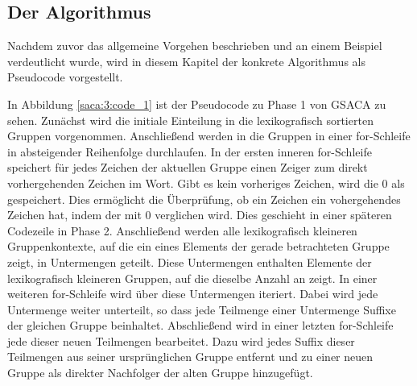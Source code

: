 \newpage
\subsection{Der Algorithmus}
\label{gsaca:chapter4}
%
Nachdem zuvor das allgemeine Vorgehen beschrieben und an einem Beispiel verdeutlicht wurde, wird in diesem Kapitel der konkrete Algorithmus als Pseudocode vorgestellt. 

In Abbildung \ref{saca:3:code_1} ist der Pseudocode zu Phase 1 von GSACA zu sehen.
Zunächst wird die initiale Einteilung in die lexikografisch sortierten Gruppen vorgenommen. 
Anschließend werden in die Gruppen in einer for-Schleife in absteigender Reihenfolge durchlaufen.
In der ersten inneren for-Schleife speichert für jedes Zeichen der aktuellen Gruppe einen Zeiger zum direkt vorhergehenden Zeichen im Wort.
Gibt es kein vorheriges Zeichen, wird die 0 als \prevpointer gespeichert. 
Dies ermöglicht die Überprüfung, ob ein Zeichen ein vohergehendes Zeichen hat, indem der \prevpointer mit 0 verglichen wird. 
Dies geschieht in einer späteren Codezeile in Phase 2. 
Anschließend werden alle lexikografisch kleineren Gruppenkontexte, auf die ein \prevpointer eines Elements der gerade betrachteten Gruppe zeigt, in Untermengen geteilt.
Diese Untermengen enthalten Elemente der lexikografisch kleineren Gruppen, auf die dieselbe Anzahl an \prevpointern zeigt.
In einer weiteren for-Schleife wird über diese Untermengen iteriert.
Dabei wird jede Untermenge weiter unterteilt, so dass jede Teilmenge einer Untermenge Suffixe der gleichen Gruppe beinhaltet.
Abschließend wird in einer letzten for-Schleife jede dieser neuen Teilmengen bearbeitet.
Dazu wird jedes Suffix dieser Teilmengen aus seiner ursprünglichen Gruppe entfernt und zu einer neuen Gruppe als direkter Nachfolger der alten Gruppe hinzugefügt.



